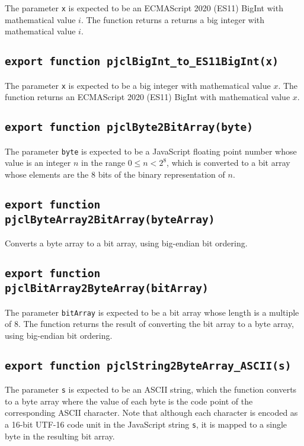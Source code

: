\documentclass[12pt]{article}
\begin{document}
The parameter {\tt x} is expected to be an ECMAScript 2020 (ES11) BigInt with
mathematical value $i$.
The function returns a returns a big integer with mathematical value $i$.

\subsection{\tt export function pjclBigInt_to_ES11BigInt(x)}

The parameter {\tt x} is expected to be a big integer with mathematical value $x$.
The function returns an ECMAScript 2020 (ES11) BigInt with mathematical value $x$.

\subsection{\tt export function pjclByte2BitArray(byte)}

The parameter {\tt byte} is expected to be a JavaScript floating point
number whose value is an integer $n$ in the range $0\leq n < 2^8$,
which is converted to a bit array whose elements are the 8 bits of the
binary representation of $n$.

\subsection{\tt export function pjclByteArray2BitArray(byteArray)}

Converts a byte array to a bit array, using big-endian bit ordering. 

\subsection{\tt export function pjclBitArray2ByteArray(bitArray)}

The parameter {\tt bitArray} is expected to be a bit array whose length
is a multiple of 8.  The function returns the result of converting the bit array to
a byte array, using big-endian bit ordering. 

\subsection{\tt export function pjclString2ByteArray\_ASCII(s)}

The parameter {\tt s} is expected to be an ASCII string, which the
function converts to a byte array where the value of each byte is the 
code point of the corresponding ASCII character.  Note that although 
each character is encoded as a 16-bit UTF-16 code unit in the JavaScript string {\tt s}, 
it is mapped to a single byte in the resulting bit array.
\end{document}
